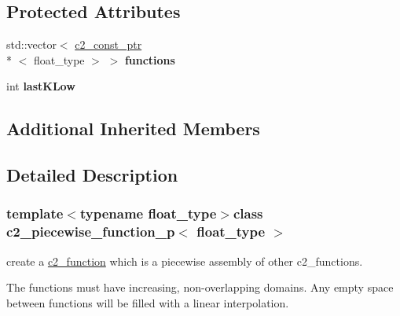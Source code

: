 \subsection*{Protected Attributes}
\begin{DoxyCompactItemize}
\item 
\hypertarget{classc2__piecewise__function__p_aa408053c36b9fa349a5ea9b0b4badc0d}{std\-::vector$<$ \hyperlink{classc2__const__ptr}{c2\-\_\-const\-\_\-ptr}\\*
$<$ float\-\_\-type $>$ $>$ {\bfseries functions}}\label{classc2__piecewise__function__p_aa408053c36b9fa349a5ea9b0b4badc0d}

\item 
\hypertarget{classc2__piecewise__function__p_a8231d5c512db23c48712b7cba0ea0bca}{int {\bfseries last\-K\-Low}}\label{classc2__piecewise__function__p_a8231d5c512db23c48712b7cba0ea0bca}

\end{DoxyCompactItemize}
\subsection*{Additional Inherited Members}


\subsection{Detailed Description}
\subsubsection*{template$<$typename float\-\_\-type$>$class c2\-\_\-piecewise\-\_\-function\-\_\-p$<$ float\-\_\-type $>$}

create a \hyperlink{classc2__function}{c2\-\_\-function} which is a piecewise assembly of other c2\-\_\-functions.

The functions must have increasing, non-\/overlapping domains. Any empty space between functions will be filled with a linear interpolation. 

